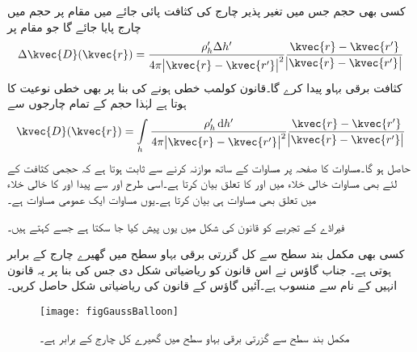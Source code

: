 کسی بھی حجم جس میں تغیر پذیر  چارج کی کثافت پائی جائے میں مقام  پر  حجم میں   چارج پایا جائے گا جو مقام  پر
\begin{align*}
\Delta \kvec{D}(\kvec{r})=\frac{\rho_h' \Delta h'}{4\pi \abs{\kvec{r}-\kvec{r'}}^2} \frac{\kvec{r}-\kvec{r'}}{\abs{\kvec{r}-\kvec{r'}}}
\end{align*} 
کثافت برقی بہاو پیدا کرے گا۔قانون کولمب خطی ہونے کی بنا پر  بھی خطی نوعیت کا ہوتا ہے لہٰذا حجم کے تمام چارجوں سے
\begin{align}\label{مساوات_گاؤس_حجم_چارج_کے_بہاو_کی_کثافت}
\kvec{D}(\kvec{r})=\int\limits_{h}\frac{\rho_h' \dif h'}{4\pi \abs{\kvec{r}-\kvec{r'}}^2} \frac{\kvec{r}-\kvec{r'}}{\abs{\kvec{r}-\kvec{r'}}}
\end{align} 
حاصل ہو گا۔مساوات  کا صفحہ  پر مساوات  کے ساتھ موازنہ کرنے سے ثابت ہوتا ہے کہ حجمی کثافت کے لئے بھی مساوات  خالی خلاء میں  اور  کا تعلق بیان کرتا ہے۔اسی طرح  اور  سے پیدا  اور  کا خالی خلاء میں تعلق بھی مساوات   ہی بیان کرتا ہے۔یوں  مساوات  ایک عمومی مساوات ہے۔

فیراڈے کے تجربے کو قانون کی شکل میں یوں پیش کیا جا سکتا ہے جسے  کہتے ہیں۔

کسی بھی مکمل بند سطح سے  کل گزرتی برقی بہاو سطح میں گھیرے چارج کے برابر ہوتی ہے۔
جناب گاؤس نے اس قانون کو ریاضیاتی شکل دی جس کی بنا پر یہ قانون انہیں کے نام سے منسوب ہے۔آئیں گاؤس کے قانون کی ریاضیاتی شکل حاصل کریں۔
\begin{figure}
\centering
\texttt{[image: figGaussBalloon]}
\caption{مکمل بند سطح سے گزرتی برقی بہاو سطح میں گھیرے کل چارج کے برابر ہے۔}
\label{شکل_گاؤس_کا_قانون}
\end{figure}

